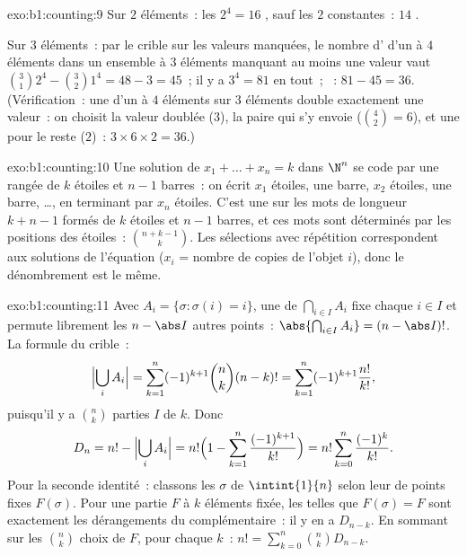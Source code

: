 \begin{solution}{exo:b1:counting:9}
Sur $2$ éléments~: les $2^4 = 16$ , sauf les $2$ 
constantes~: $14$ .

Sur $3$ éléments~: par le crible sur les valeurs manquées, le
nombre d' d'un  à $4$ éléments dans un ensemble à $3$
éléments manquant au moins une valeur vaut $\binom 31 2^4 - \binom 32 1^4
= 48 - 3 = 45$~; il y a $3^4 = 81$  en tout~; ~:
$81 - 45 = 36$. (Vérification~: une  d'un  à $4$ éléments
sur $3$ éléments double exactement une valeur~: on choisit la valeur doublée
($3$), la paire qui s'y envoie ($\binom 42 = 6$), et une  pour le
reste ($2$)~: $3 \times 6 \times 2 = 36$.)
\end{solution}

\begin{solution}{exo:b1:counting:10}
Une solution de $x_1 + \dots + x_n = k$ dans $\N^n$ se code par une rangée de
$k$ étoiles et $n - 1$ barres~: on écrit $x_1$ étoiles, une barre, $x_2$
étoiles, une barre, \dots, en terminant par $x_n$ étoiles. C'est une 
sur les mots de longueur $k + n - 1$ formés de $k$ étoiles et $n - 1$ barres,
et ces mots sont déterminés par les positions des étoiles~:
$\binom{n + k - 1}{k}$. Les sélections avec répétition correspondent aux
solutions de l'équation ($x_i$ = nombre de copies de l'objet $i$), donc le
dénombrement est le même.
\end{solution}

\begin{solution}{exo:b1:counting:11}
Avec $A_i = \{\sigma : \sigma(i) = i\}$, une  de
$\bigcap_{i \in I} A_i$ fixe chaque $i \in I$ et permute librement les
$n - \abs I$ autres points~: $\abs{\bigcap_{i \in I} A_i} =
(n - \abs I)!$. La formule du crible~:
\[
\Bigl|\bigcup_i A_i\Bigr|
= \sum_{k=1}^{n} (-1)^{k+1} \binom nk (n-k)!
= \sum_{k=1}^{n} (-1)^{k+1} \frac{n!}{k!} ,
\]
puisqu'il y a $\binom nk$ parties $I$ de  $k$. Donc
\[
D_n = n! - \Bigl|\bigcup_i A_i\Bigr|
= n!\Bigl(1 - \sum_{k=1}^{n} \frac{(-1)^{k+1}}{k!}\Bigr)
= n! \sum_{k=0}^{n} \frac{(-1)^k}{k!} .
\]
Pour la seconde identité~: classons les  $\sigma$ de
$\intint{1}{n}$ selon leur  de points fixes $F(\sigma)$. Pour une
partie $F$ à $k$ éléments fixée, les  telles que $F(\sigma) = F$
sont exactement les dérangements du complémentaire~: il y en a $D_{n-k}$.
En sommant sur les $\binom nk$ choix de $F$, pour chaque $k$~:
$n! = \sum_{k=0}^{n} \binom nk D_{n-k}$.
\end{solution}

